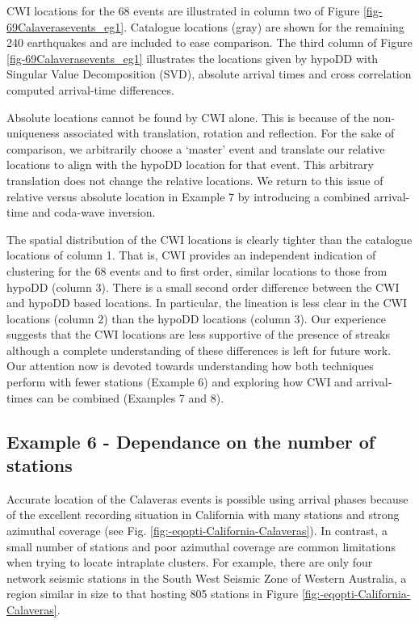 \documentclass[12pt,double]{article}
\begin{document}
CWI locations for the 68 events are illustrated in column two of
Figure \ref{fig-69Calaverasevents_eg1}. Catalogue locations (gray)
are shown for the remaining 240 earthquakes and are included to ease
comparison. The third column of Figure
\ref{fig-69Calaverasevents_eg1} illustrates the locations given by
hypoDD with Singular Value Decomposition (SVD), absolute arrival
times and cross correlation computed arrival-time differences.

Absolute locations cannot be found by CWI alone. This is because of
the non-uniqueness associated with translation, rotation and
reflection. For the sake of comparison, we arbitrarily choose a
`master' event and translate our relative locations to align with
the hypoDD location for that event. This arbitrary translation
does not change the relative locations. We return to this issue of
relative versus absolute location in Example 7 by introducing a
combined arrival-time and coda-wave inversion.

The spatial distribution of the CWI locations is clearly tighter
than the catalogue locations of column 1. That is, CWI provides an
independent indication of clustering for the 68 events and to first
order, similar locations to those from hypoDD (column 3). There is a
small second order difference between the CWI and hypoDD based
locations. In particular, the lineation is less clear in the CWI
locations (column 2) than the hypoDD locations (column 3). Our
experience suggests that the CWI locations are less supportive of the presence of
streaks although a complete understanding of these differences is
left for future work. Our attention now is devoted towards
understanding how both techniques perform with fewer stations
(Example 6) and exploring how CWI and arrival-times can be combined
(Examples 7 and 8).


\subsection*{Example 6 - Dependance on the number of stations}


Accurate location of the Calaveras events is possible using arrival
phases because of the excellent recording situation in California
with many stations and strong azimuthal coverage (see Fig.
\ref{fig:-eqopti-California-Calaveras}). In contrast, a small number
of stations and poor azimuthal coverage are common limitations when
trying to locate intraplate clusters. For example, there are only
four network seismic stations in the South West Seismic Zone of
Western Australia, a region similar in size to that hosting 805
stations in Figure \ref{fig:-eqopti-California-Calaveras}.
\end{document}
